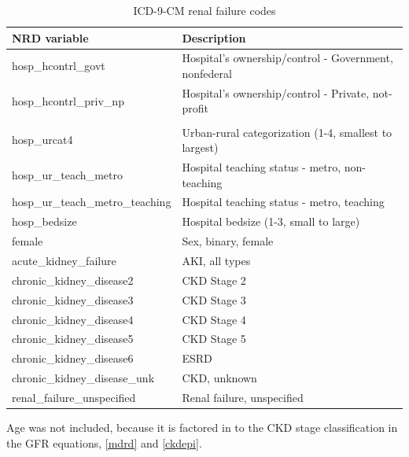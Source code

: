 \documentclass[12pt]{ociamthesis}\usepackage[]{graphicx}\usepackage[]{color}
\begin{document}
\begin{table}[]
\centering
\begin{tabular}{ll}
  NRD variable   & Description \\
\hline
  hosp\_hcontrl\_govt            & Hospital's ownership/control - Government, nonfederal  \\
  hosp\_hcontrl\_priv\_np         & Hospital's ownership/control - Private, not-profit  \\ \\
  hosp\_urcat4                  & Urban-rural categorization (1-4, smallest to largest) \\
  hosp\_ur\_teach\_metro          & Hospital teaching status - metro, non-teaching  \\
  hosp\_ur\_teach\_metro\_teaching & Hospital teaching status - metro, teaching \\
  hosp\_bedsize                 & Hospital bedsize (1-3, small to large)\\
  female                       & Sex, binary, female \\
  acute\_kidney\_failure         & AKI, all types \\
  chronic\_kidney\_disease2      & CKD Stage 2 \\
  chronic\_kidney\_disease3      & CKD Stage 3 \\
  chronic\_kidney\_disease4      & CKD Stage 4 \\
  chronic\_kidney\_disease5      & CKD Stage 5 \\
  chronic\_kidney\_disease6      & ESRD \\
  chronic\_kidney\_disease\_unk  & CKD, unknown \\
  renal\_failure\_unspecified    & Renal failure, unspecified \\
\end{tabular}
\caption{ICD-9-CM renal failure codes}
\label{logistic-regression-features}
\end{table}

Age was not included, because it is factored in to the CKD stage classification in the GFR equations, \ref{mdrd} and \ref{ckdepi}.
\end{document}
